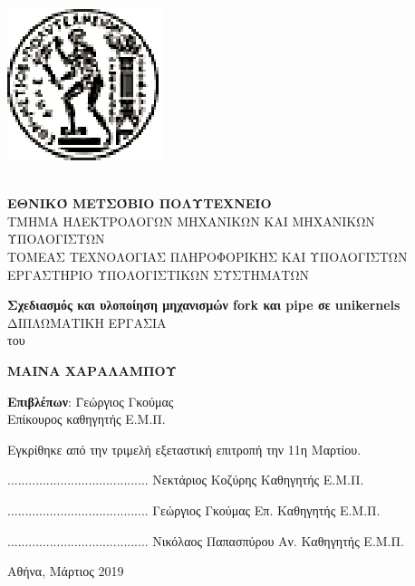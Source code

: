 \documentclass[12pt, twoside, a4paper]{report}
\begin{document}
\newpage
\thispagestyle{empty}
\hspace{10pt}
\newpage
\thispagestyle{empty}
\includegraphics[scale=1.5]{figures/pyrforos.eps}
\noindent
\parbox[b]{0.7\textwidth} {\textbf{
\noindent
\\
\normalsize{ΕΘΝΙΚΌ}
\normalsize{ΜΕΤΣΌΒΙΟ}
\normalsize{ΠΟΛΥΤΕΧΝΕΊΟ}} \\
\small
TMHMA
ΗΛΕΚΤΡΟΛΟΓΩΝ
ΜΗΧΑΝΙΚΩΝ
ΚΑΙ
ΜΗΧΑΝΙΚΩΝ
ΥΠΟΛΟΓΙΣΤΩΝ \\
ΤΟΜΕΑΣ ΤΕΧΝΟΛΟΓΙΑΣ ΠΛΗΡΟΦΟΡΙΚΗΣ ΚΑΙ ΥΠΟΛΟΓΙΣΤΩΝ \\
ΕΡΓΑΣΤΗΡΙΟ ΥΠΟΛΟΓΙΣΤΙΚΩΝ ΣΥΣΤΗΜΑΤΩΝ \\
}

\begin{center}
\vspace{7ex}
\large \textbf{Σχεδιασμός και υλοποίηση μηχανισμών fork και pipe σε unikernels} \\
\vspace{8ex}
\large
ΔΙΠΛΩΜΑΤΙΚΗ ΕΡΓΑΣΙΑ\\
\vspace{2ex}
\normalsize
του \\
\vspace{2ex}
\parbox[c]{0.4\textwidth} { \center\textbf{
ΜΑΙΝΑ ΧΑΡΑΛΑΜΠΟΥ }}
\vspace{10ex}
\begin{tabbing}
	\textbf{Επιβλέπων}: \= Γεώργιος Γκούμας \\
			    \> Επίκουρος καθηγητής Ε.Μ.Π.
\end{tabbing}
\end{center}

\noindent
Εγκρίθηκε από την τριμελή εξεταστική επιτροπή την 11η Μαρτίου.

\begin{center}
\scriptsize
\parbox[b]{0.3\textwidth} {\center
	........................................
	Νεκτάριος Κοζύρης
	Καθηγητής Ε.Μ.Π.
}
\parbox[b]{0.3\textwidth} {\center
	........................................
	Γεώργιος Γκούμας
	Επ. Καθηγητής Ε.Μ.Π.
}
\parbox[b]{0.3\textwidth} {\center
	........................................
	Νικόλαος Παπασπύρου
	Αν. Καθηγητής Ε.Μ.Π.
}
\end{center}
\vspace{10ex}
\begin{center}
\normalsize
Αθήνα, Μάρτιος 2019
\end{center}
\newpage
\thispagestyle{empty}
\hspace{10pt}
\end{document}
